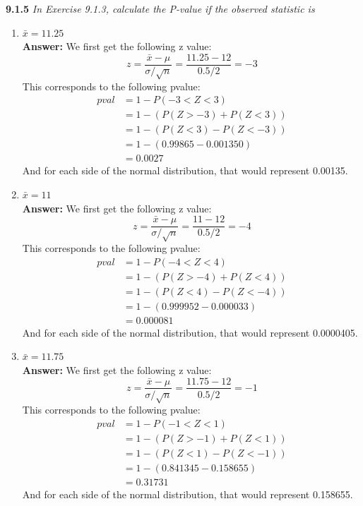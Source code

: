 \documentclass[11pt]{article}
\begin{document}
\noindent \textbf{9.1.5} \emph{In Exercise 9.1.3, calculate the P-value if the observed statistic is}
\begin{enumerate}
\item \emph{$\bar{x} = 11.25$}
\\\textbf{Answer:}
We first get the following z value:
\begin{equation}
z = \frac{\bar{x} - \mu}{\sigma/\sqrt{n}} = \frac{11.25 - 12}{0.5/2} = -3
\end{equation}
This corresponds to the following pvalue:
\begin{equation}
\begin{split}
pval &= 1 - P(-3 < Z < 3)\\
&= 1 - (P(Z > -3) + P(Z < 3)) \\
&= 1 - (P(Z < 3) - P(Z< -3)) \\
&= 1 - (0.99865 - 0.001350) \\
&= 0.0027
\end{split}
\end{equation}
And for each side of the normal distribution, that would represent 0.00135.

\item \emph{$\bar{x} = 11$}
\\\textbf{Answer:}
We first get the following z value:
\begin{equation}
z = \frac{\bar{x} - \mu}{\sigma/\sqrt{n}} = \frac{11 - 12}{0.5/2} = -4
\end{equation}
This corresponds to the following pvalue:
\begin{equation}
\begin{split}
pval &= 1 - P(-4 < Z < 4)\\
&= 1 - (P(Z > -4) + P(Z < 4)) \\
&= 1 - (P(Z < 4) - P(Z< -4)) \\
&= 1 - (0.999952 - 0.000033) \\
&= 0.000081
\end{split}
\end{equation}
And for each side of the normal distribution, that would represent 0.0000405.

\item \emph{$\bar{x} = 11.75$}
\\\textbf{Answer:}
We first get the following z value:
\begin{equation}
z = \frac{\bar{x} - \mu}{\sigma/\sqrt{n}} = \frac{11.75 - 12}{0.5/2} = -1
\end{equation}
This corresponds to the following pvalue:
\begin{equation}
\begin{split}
pval &= 1 - P(-1 < Z < 1)\\
&= 1 - (P(Z > -1) + P(Z < 1)) \\
&= 1 - (P(Z < 1) - P(Z< -1)) \\
&= 1 - (0.841345 - 0.158655) \\
&= 0.31731
\end{split}
\end{equation}
And for each side of the normal distribution, that would represent 0.158655.
\end{enumerate}
\end{document}
